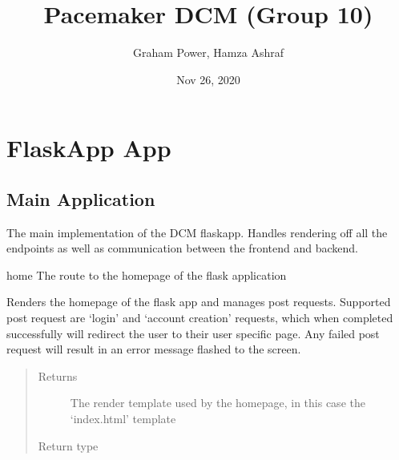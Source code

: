 \documentclass[letterpaper,10pt,english]{sphinxmanual}
\title{Pacemaker DCM (Group 10)}
\date{Nov 26, 2020}
\author{Graham Power, Hamza Ashraf}
\begin{document}
\pagestyle{empty}
\sphinxmaketitle
\pagestyle{plain}
\sphinxtableofcontents
\pagestyle{normal}
\label{\detokenize{index::doc}}



\chapter{FlaskApp App}
\label{\detokenize{index:module-app}}\label{\detokenize{index:flaskapp-app}}

\section{Main Application}
\label{\detokenize{index:main-application}}
The main implementation of the DCM flaskapp.
Handles rendering off all the endpoints as well
as communication between the frontend and
backend.

\begin{fulllineitems}
\label{\detokenize{index:app.home}}
home The route to the homepage of the flask application

Renders the homepage of the flask app and manages post requests.
Supported post request are ‘login’ and ‘account creation’ requests,
which when completed successfully will redirect the user to their
user specific page. Any failed post request will result in an error
message flashed to the screen.
\begin{quote}\begin{description}
\item[{Returns}] \leavevmode
The render template used by the homepage, in this case the ‘index.html’ template

\item[{Return type}] \leavevmode
{}

\end{description}\end{quote}

\end{fulllineitems}

\end{document}

